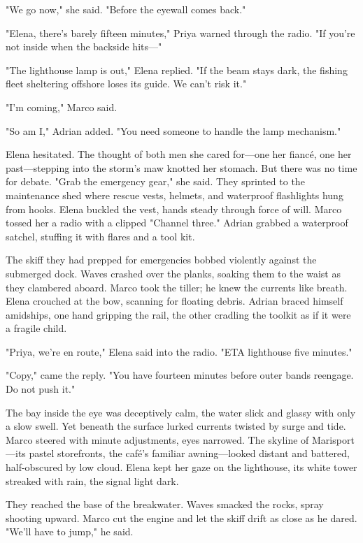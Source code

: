 "We go now," she said. "Before the eyewall comes back."

"Elena, there's barely fifteen minutes," Priya warned through the radio. "If you're not inside when the backside hits—"

"The lighthouse lamp is out," Elena replied. "If the beam stays dark, the fishing fleet sheltering offshore loses its guide. We can't risk it."

"I'm coming," Marco said.

"So am I," Adrian added. "You need someone to handle the lamp mechanism."

Elena hesitated. The thought of both men she cared for—one her fiancé, one her past—stepping into the storm's maw knotted her stomach. But there was no time for debate. "Grab the emergency gear," she said. They sprinted to the maintenance shed where rescue vests, helmets, and waterproof flashlights hung from hooks. Elena buckled the vest, hands steady through force of will. Marco tossed her a radio with a clipped "Channel three." Adrian grabbed a waterproof satchel, stuffing it with flares and a tool kit.

The skiff they had prepped for emergencies bobbed violently against the submerged dock. Waves crashed over the planks, soaking them to the waist as they clambered aboard. Marco took the tiller; he knew the currents like breath. Elena crouched at the bow, scanning for floating debris. Adrian braced himself amidships, one hand gripping the rail, the other cradling the toolkit as if it were a fragile child.

"Priya, we're en route," Elena said into the radio. "ETA lighthouse five minutes."

"Copy," came the reply. "You have fourteen minutes before outer bands reengage. Do not push it."

The bay inside the eye was deceptively calm, the water slick and glassy with only a slow swell. Yet beneath the surface lurked currents twisted by surge and tide. Marco steered with minute adjustments, eyes narrowed. The skyline of Marisport—its pastel storefronts, the café's familiar awning—looked distant and battered, half-obscured by low cloud. Elena kept her gaze on the lighthouse, its white tower streaked with rain, the signal light dark.

They reached the base of the breakwater. Waves smacked the rocks, spray shooting upward. Marco cut the engine and let the skiff drift as close as he dared. "We'll have to jump," he said.


